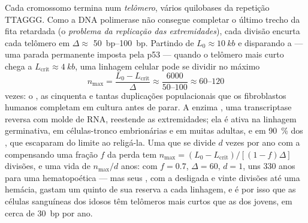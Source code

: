\begin{theorem}\label{thm:b3:stem-cells:hayflick}
Cada cromossomo termina num \emph{telômero}, vários quilobases da
repetição TTAGGG. Como a DNA polimerase não consegue completar o último
trecho da fita retardada (o \emph{problema da replicação das
extremidades}), cada divisão encurta cada telômero em $\Delta \approx$
\qtyrange{50}{100}{bp}. Partindo de $L_{0} \approx \qty{10}{kb}$ e
disparando a \emph{} --- uma parada permanente
imposta pela p53 --- quando o telômero mais curto chega a
$L_{\text{crit}} \approx \qty{4}{kb}$, uma linhagem celular pode se
dividir no máximo
\[
n_{\max} = \frac{L_{0} - L_{\text{crit}}}{\Delta} \approx \frac{6000}{50\text{--}100} \approx 60\text{--}120
\]
vezes: o \emph{}, as cinquenta e tantas duplicações
populacionais que os fibroblastos humanos completam em cultura antes de
parar. A enzima \emph{}, uma transcriptase reversa com molde de
RNA, reestende as extremidades; ela é ativa na linhagem germinativa, em
células-tronco embrionárias e em muitas adultas, e em \qty{90}{\%} dos
, que escaparam do limite ao religá-la. Uma  que se
divide $d$ vezes por ano com a  compensando uma fração $f$ da
perda tem $n_{\max} = (L_{0} - L_{\text{crit}})/[(1 - f)\Delta]$
divisões, e uma vida de $n_{\max}/d$ anos: com $f = 0.7$, $\Delta
= 60$,
$d = 1$, uns 330 anos para uma  hematopoética --- mas seus
, com a  desligada e vinte divisões até uma
hemácia, gastam um quinto de sua reserva a cada linhagem, e é por isso
que as células sanguíneas dos idosos têm telômeros mais curtos que as dos
jovens, em cerca de \qty{30}{bp} por ano.
\end{theorem}

